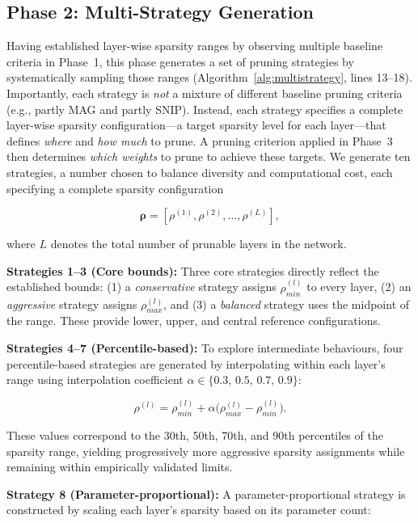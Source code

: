 \documentclass[11pt, conference]{IEEEtran}
\begin{document}
\subsection{Phase 2: Multi-Strategy Generation}

Having established layer-wise sparsity ranges by observing multiple baseline criteria in Phase~1, this phase generates a set of pruning strategies by systematically sampling those ranges (Algorithm~\ref{alg:multistrategy}, lines 13--18). Importantly, each strategy is \emph{not} a mixture of different baseline pruning criteria (e.g., partly MAG and partly SNIP). Instead, each strategy specifies a complete layer-wise sparsity configuration—a target sparsity level for each layer—that defines \emph{where} and \emph{how much} to prune. A pruning criterion applied in Phase~3 then determines \emph{which weights} to prune to achieve these targets. We generate ten strategies, a number chosen to balance diversity and computational cost, each specifying a complete sparsity configuration

\begin{equation}
\boldsymbol{\rho} = [\rho^{(1)}, \rho^{(2)}, \ldots, \rho^{(L)}],
\end{equation}

where $L$ denotes the total number of prunable layers in the network.

\textbf{Strategies 1--3 (Core bounds):} Three core strategies directly reflect the established bounds: (1) a \emph{conservative} strategy assigns $\rho_{min}^{(l)}$ to every layer, (2) an \emph{aggressive} strategy assigns $\rho_{max}^{(l)}$, and (3) a \emph{balanced} strategy uses the midpoint of the range. These provide lower, upper, and central reference configurations.

\textbf{Strategies 4--7 (Percentile-based):} To explore intermediate behaviours, four percentile-based strategies are generated by interpolating within each layer's range using interpolation coefficient $\alpha \in \{0.3,\,0.5,\,0.7,\,0.9\}$:

\begin{equation}
\rho^{(l)} = \rho_{min}^{(l)} + \alpha\big(\rho_{max}^{(l)} - \rho_{min}^{(l)}\big).
\end{equation}

These values correspond to the 30th, 50th, 70th, and 90th percentiles of the sparsity range, yielding progressively more aggressive sparsity assignments while remaining within empirically validated limits.

\textbf{Strategy 8 (Parameter-proportional):} A parameter-proportional strategy is constructed by scaling each layer's sparsity based on its parameter count:
\end{document}
